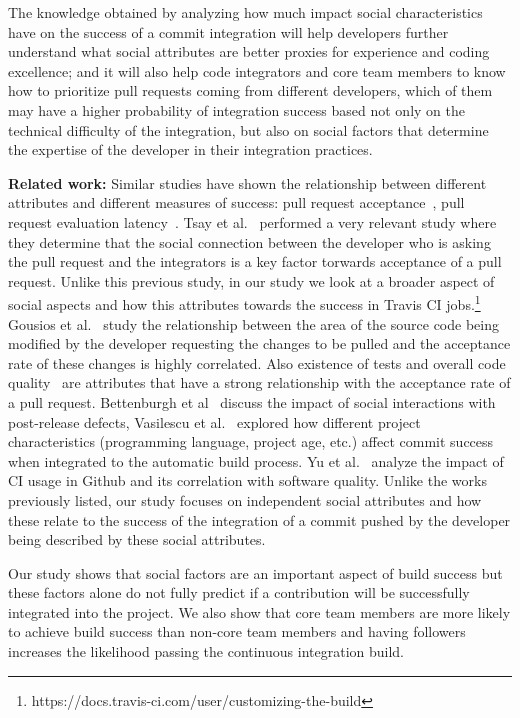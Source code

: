 \documentclass[10pt, conference]{IEEEtran}
\begin{document}
The knowledge obtained by 
analyzing how much impact social characteristics have on the success of a commit 
integration will help developers further understand what social attributes are 
better proxies for experience and coding excellence; and it will also help code 
integrators and core team members to know how to prioritize pull requests coming 
from different developers, which of them may have a higher probability of 
integration success based not only on the technical difficulty of the 
integration, but also on social factors that determine the expertise of the 
developer in their integration practices.

\textbf{Related work:}
Similar studies have shown the relationship between different attributes and 
different measures of success: pull request acceptance~\cite{gousios14, 
gousios15,tsay14icse,tsay14fse}, pull request evaluation latency~\cite{Yu15}.
Tsay et al.~\cite{tsay14icse} performed a very relevant study where they 
determine that the social connection between the developer who is asking the 
pull request and the integrators is a key factor torwards acceptance of a pull 
request. Unlike this previous study, in our study we look at a broader aspect of 
social aspects and how this attributes towards the success in Travis
CI jobs.\footnote{https://docs.travis-ci.com/user/customizing-the-build} 
Gousios et al.~\cite{gousios14} study the relationship between the area of the 
source code being modified by the developer requesting the changes to be pulled 
and the acceptance rate of these changes is highly correlated. Also existence of 
tests and overall code quality~\cite{gousios15} are attributes that have a 
strong relationship with the acceptance rate of a pull request. Bettenburgh et 
al~\cite{bettenburgh10} discuss the impact of social interactions with 
post-release defects, Vasilescu et al.~\cite{vasilescu14} explored how different 
project characteristics (programming language, project age, etc.) affect commit 
success when integrated to the automatic build process. Yu et al.~\cite{yu16} 
analyze the impact of CI usage in Github and its correlation with software 
quality. Unlike the works previously listed, our study focuses on independent social 
attributes and how these relate to the success of the integration of a commit 
pushed by the developer being described by these social attributes.

Our study shows that social factors are an important aspect of build success but
these factors alone do not fully predict if a contribution will be successfully integrated into the project. We also show
that core team members are more likely to achieve build success than non-core
team members and having followers increases the likelihood passing the
continuous integration build.
\end{document}
